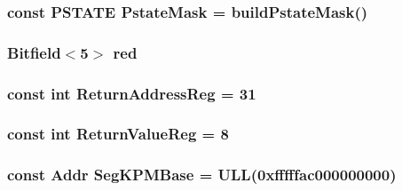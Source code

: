 \label{namespaceSparcISA_a9d8b751eeaa798163459309b2f3d0b80}
\hypertarget{namespaceSparcISA_a8f97dccd23b5a80b78a87d1a97178072}{
\subsubsection[{PstateMask}]{\setlength{\rightskip}{0pt plus 5cm}const PSTATE {\bf PstateMask} = buildPstateMask()}}
\label{namespaceSparcISA_a8f97dccd23b5a80b78a87d1a97178072}
\hypertarget{namespaceSparcISA_a3daf539b069b3e0d79ce6137bac5a47f}{
\subsubsection[{red}]{\setlength{\rightskip}{0pt plus 5cm}Bitfield$<$5$>$ {\bf red}}}
\label{namespaceSparcISA_a3daf539b069b3e0d79ce6137bac5a47f}
\hypertarget{namespaceSparcISA_a99ba4a35fbf9debeb1f7ddb1db7b9967}{
\subsubsection[{ReturnAddressReg}]{\setlength{\rightskip}{0pt plus 5cm}const int {\bf ReturnAddressReg} = 31}}
\label{namespaceSparcISA_a99ba4a35fbf9debeb1f7ddb1db7b9967}
\hypertarget{namespaceSparcISA_a472eedbcba9726645062b921f8d07e98}{
\subsubsection[{ReturnValueReg}]{\setlength{\rightskip}{0pt plus 5cm}const int {\bf ReturnValueReg} = 8}}
\label{namespaceSparcISA_a472eedbcba9726645062b921f8d07e98}
\hypertarget{namespaceSparcISA_a1b6320d4c0e7fb8b5cf9f28cef6681e0}{
\subsubsection[{SegKPMBase}]{\setlength{\rightskip}{0pt plus 5cm}const {\bf Addr} {\bf SegKPMBase} = ULL(0xfffffac000000000)}}
